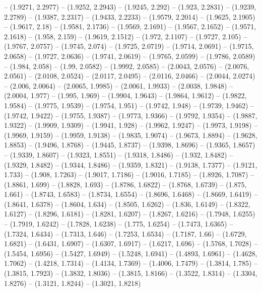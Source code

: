 {  -- (1.9271, 2.2977) -- (1.9252, 2.2943) -- (1.9245, 2.292) -- (1.923, 2.2831) 
  -- (1.9239, 2.2789) -- (1.9387, 2.2317) -- (1.9433, 2.2233) -- (1.9579, 
  2.2014) -- (1.9625, 2.1905) -- (1.9617, 2.18) -- (1.9581, 2.1736) -- (1.9569, 
  2.1691) -- (1.9567, 2.1652) -- (1.9571, 2.1618) -- (1.958, 2.159) -- (1.9619, 
  2.1512) -- (1.972, 2.1107) -- (1.9727, 2.105) -- (1.9767, 2.0757) -- (1.9745, 
  2.074) -- (1.9725, 2.0719) -- (1.9714, 2.0691) -- (1.9715, 2.0658) -- (1.9727,
   2.0636) -- (1.9741, 2.0619) -- (1.9765, 2.0599) -- (1.9786, 2.0589) -- 
  (1.984, 2.058) -- (1.99, 2.0582) -- (1.9992, 2.0585) -- (2.0043, 2.0576) -- 
  (2.0076, 2.0561) -- (2.0108, 2.0524) -- (2.0117, 2.0495) -- (2.0116, 2.0466) 
  -- (2.0044, 2.0274) -- (2.006, 2.0064) -- (2.0065, 1.9985) -- (2.0061, 1.9933)
   -- (2.0038, 1.9848) -- (2.0004, 1.977) -- (1.995, 1.969) -- (1.9904, 1.9643) 
  -- (1.9864, 1.9612) -- (1.9822, 1.9584) -- (1.9775, 1.9539) -- (1.9754, 1.951)
   -- (1.9742, 1.948) -- (1.9739, 1.9462) -- (1.9742, 1.9422) -- (1.9755, 
  1.9387) -- (1.9773, 1.9366) -- (1.9792, 1.9354) -- (1.9887, 1.9322) -- 
  (1.9909, 1.9309) -- (1.9941, 1.928) -- (1.9962, 1.9247) -- (1.9973, 1.9198) --
   (1.9969, 1.9159) -- (1.9959, 1.9138) -- (1.9835, 1.9074) -- (1.9673, 1.8894) 
  -- (1.9628, 1.8853) -- (1.9496, 1.8768) -- (1.9445, 1.8737) -- (1.9398, 
  1.8696) -- (1.9365, 1.8657) -- (1.9339, 1.8607) -- (1.9323, 1.8551) -- 
  (1.9318, 1.8486) -- (1.932, 1.8482) -- (1.9329, 1.8482) -- (1.9344, 1.8486) --
   (1.9359, 1.8321) -- (1.9138, 1.7377) -- (1.9121, 1.733) -- (1.908, 1.7263) --
   (1.9017, 1.7186) -- (1.9016, 1.7185) -- (1.8926, 1.7087) -- (1.8861, 1.699) 
  -- (1.8828, 1.693) -- (1.8786, 1.6822) -- (1.8768, 1.6739) -- (1.875, 1.661) 
  -- (1.8743, 1.6583) -- (1.8734, 1.6554) -- (1.8696, 1.6468) -- (1.8669, 
  1.6419) -- (1.8641, 1.6378) -- (1.8604, 1.634) -- (1.8505, 1.6262) -- (1.836, 
  1.6149) -- (1.8322, 1.6127) -- (1.8296, 1.6181) -- (1.8281, 1.6207) -- 
  (1.8267, 1.6216) -- (1.7948, 1.6255) -- (1.7919, 1.6242) -- (1.7828, 1.6238) 
  -- (1.775, 1.6254) -- (1.7473, 1.6365) -- (1.7324, 1.6434) -- (1.7313, 1.646) 
  -- (1.7253, 1.6534) -- (1.7187, 1.66) -- (1.6729, 1.6821) -- (1.6431, 1.6907) 
  -- (1.6307, 1.6917) -- (1.6217, 1.696) -- (1.5768, 1.7028) -- (1.5454, 1.6956)
   -- (1.5427, 1.6949) -- (1.5248, 1.6941) -- (1.4893, 1.6961) -- (1.4628, 
  1.7062) -- (1.4218, 1.7314) -- (1.4134, 1.7369) -- (1.4006, 1.7479) -- 
  (1.3814, 1.785) -- (1.3815, 1.7923) -- (1.3832, 1.8036) -- (1.3815, 1.8166) --
   (1.3522, 1.8314) -- (1.3304, 1.8276) -- (1.3121, 1.8244) -- (1.3021, 1.8218) 
}

